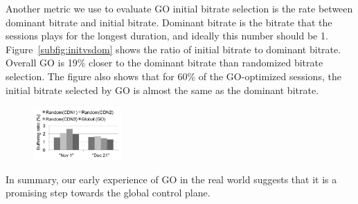 Another metric we use to evaluate GO initial bitrate selection is the rate between dominant bitrate and initial bitrate. Dominant bitrate
is the bitrate that the sessions plays for the longest duration, and ideally this number should be 1. Figure~\ref{subfig:initvsdom} shows the ratio of initial bitrate to dominant bitrate. Overall GO is 19\% closer to the dominant bitrate than randomized bitrate selection. 
The figure also shows that for 60\% of the GO-optimized sessions, the initial bitrate selected by GO is almost the same as the dominant bitrate.




\begin{figure}[h!]
\centering
 \includegraphics[width=0.3\textwidth] {figures/ab-testing-figures/policy-issue}
\tightcaption{}
\label{fig:switch-time-dist}
\end{figure}


In summary, our early experience of GO in the real world suggests that it is a promising step towards the global control plane.

